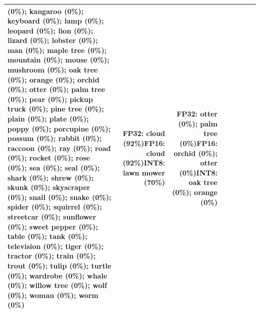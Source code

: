 \begin{longtable}{p{2.8cm} r r r r p{5.0cm} p{4.2cm} p{4.2cm}}
(0\%); kangaroo (0\%); keyboard (0\%); lamp (0\%); leopard (0\%); lion (0\%); lizard (0\%); lobster (0\%); man (0\%); maple tree (0\%); mountain (0\%); mouse (0\%); mushroom (0\%); oak tree (0\%); orange (0\%); orchid (0\%); otter (0\%); palm tree (0\%); pear (0\%); pickup truck (0\%); pine tree (0\%); plain (0\%); plate (0\%); poppy (0\%); porcupine (0\%); possum (0\%); rabbit (0\%); raccoon (0\%); ray (0\%); road (0\%); rocket (0\%); rose (0\%); sea (0\%); seal (0\%); shark (0\%); shrew (0\%); skunk (0\%); skyscraper (0\%); snail (0\%); snake (0\%); spider (0\%); squirrel (0\%); streetcar (0\%); sunflower (0\%); sweet pepper (0\%); table (0\%); tank (0\%); television (0\%); tiger (0\%); tractor (0\%); train (0\%); trout (0\%); tulip (0\%); turtle (0\%); wardrobe (0\%); whale (0\%); willow tree (0\%); wolf (0\%); woman (0\%); worm (0\%) & FP32: cloud (92\%)\newline FP16: cloud (92\%)\newline INT8: lawn mower (70\%) & FP32: otter (0\%); palm tree (0\%)\newline FP16: orchid (0\%); otter (0\%)\newline INT8: oak tree (0\%); orange (0\%) \\ \hline

\end{longtable}
